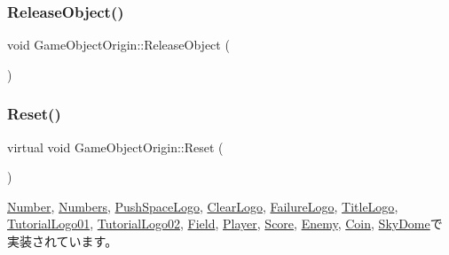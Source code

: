 \subsubsection{\texorpdfstring{Release\+Object()}{ReleaseObject()}}
{\footnotesize\ttfamily void Game\+Object\+Origin\+::\+Release\+Object (\begin{DoxyParamCaption}{ }\end{DoxyParamCaption})}

\mbox{\label{class_game_object_origin_af9af378a4fd9028316a6fdb461ed6a10}} 
\subsubsection{\texorpdfstring{Reset()}{Reset()}}
{\footnotesize\ttfamily virtual void Game\+Object\+Origin\+::\+Reset (\begin{DoxyParamCaption}{ }\end{DoxyParamCaption})\hspace{0.3cm}{\ttfamily [pure virtual]}}



\mbox{\hyperlink{class_number_a7c6facdb1b3d0acc8309e0a915863d44}{Number}}, \mbox{\hyperlink{class_numbers_a1ab67e439ba1695c8fd545dfc1650990}{Numbers}}, \mbox{\hyperlink{class_push_space_logo_afa163b1aff8df494b4f09f378bf983f0}{Push\+Space\+Logo}}, \mbox{\hyperlink{class_clear_logo_aa19369cbace0cc79957ef7b4d4dbd0f5}{Clear\+Logo}}, \mbox{\hyperlink{class_failure_logo_a542b1617087a6701f7edb345e2a72e01}{Failure\+Logo}}, \mbox{\hyperlink{class_title_logo_a8bca39d06592b95b26024c2d86ac349c}{Title\+Logo}}, \mbox{\hyperlink{class_tutorial_logo01_a01515b3f54e6731e42d60af5320ff7eb}{Tutorial\+Logo01}}, \mbox{\hyperlink{class_tutorial_logo02_a73afa56b1e98736072745dc414ebd29f}{Tutorial\+Logo02}}, \mbox{\hyperlink{class_field_a5b140074dcca821ac702da348238c6d4}{Field}}, \mbox{\hyperlink{class_player_a457153d0edd58932e37e1356f5fe5fed}{Player}}, \mbox{\hyperlink{class_score_ad01d461a2b6ca345858b2ae0a3d81cc1}{Score}}, \mbox{\hyperlink{class_enemy_ab86571061e7fcabcf8c646b1abad5581}{Enemy}}, \mbox{\hyperlink{class_coin_a52c50229ce7c1e0f459e198adac70c8d}{Coin}}, \mbox{\hyperlink{class_sky_dome_abc6f8ed1471d7b03f25924a849cae590}{Sky\+Dome}}で実装されています。

\mbox{\label{class_game_object_origin_acdf9e2140b71df0309d28b4dd90476d7}} 
